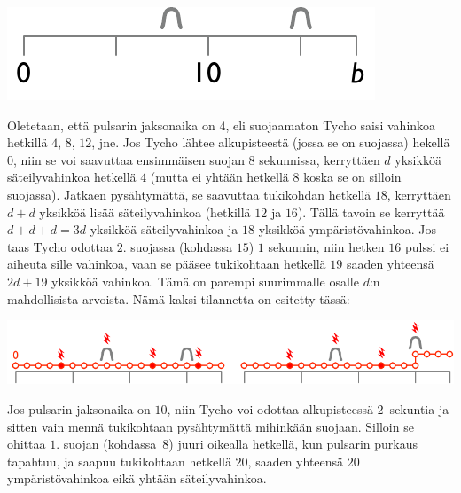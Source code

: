 \includegraphics[width=.3\textwidth]{img/samplesetup}

Oletetaan, että pulsarin jaksonaika on $4$, eli suojaamaton Tycho saisi vahinkoa 
hetkillä $4$, $8$, $12$, jne.
Jos Tycho lähtee alkupisteestä (jossa se on suojassa) hekellä $0$, niin se 
voi saavuttaa ensimmäisen suojan $8$ sekunnissa, kerryttäen $d$ yksikköä säteilyvahinkoa 
hetkellä $4$ (mutta ei yhtään hetkellä $8$ koska se on silloin suojassa).
Jatkaen pysähtymättä, se saavuttaa tukikohdan hetkellä $18$, kerryttäen $d+d$ 
yksikköä lisää säteilyvahinkoa (hetkillä $12$ ja $16$). 
Tällä tavoin se kerryttää $d+d+d=3d$ yksikköä säteilyvahinkoa ja $18$ yksikköä 
ympäristövahinkoa.
Jos taas Tycho odottaa $2.$ suojassa (kohdassa $15$) $1$ sekunnin, niin 
hetken $16$ pulssi ei aiheuta sille vahinkoa, vaan se pääsee tukikohtaan 
hetkellä $19$ saaden yhteensä $2d + 19$ yksikköä vahinkoa.
Tämä on parempi suurimmalle osalle $d$:n mahdollisista arvoista.
Nämä kaksi tilannetta on esitetty tässä:

\includegraphics[width=.8\textwidth]{img/sample1_2.pdf}

Jos pulsarin jaksonaika on $10$, niin Tycho voi odottaa alkupisteessä $2$~sekuntia 
ja sitten vain mennä tukikohtaan py\-säh\-ty\-mät\-tä mihinkään suojaan.
Silloin se ohittaa $1.$ suojan (kohdassa~$8$) juuri oikealla hetkellä, 
kun pulsarin purkaus tapahtuu, ja saapuu tukikohtaan hetkellä $20$, 
saaden yhteensä $20$ ympäristövahinkoa eikä yhtään säteilyvahinkoa.

